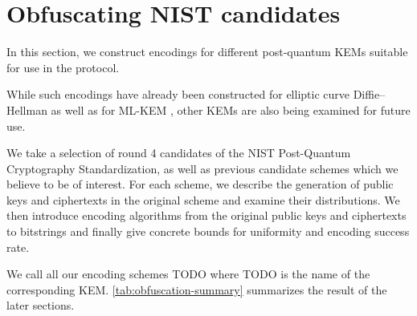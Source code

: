 \chapter{Obfuscating NIST candidates}\label{ch:obfuscation}

In this section, we construct encodings for different post-quantum KEMs suitable for use in the \drivel protocol.

While such encodings have already been constructed for elliptic curve Diffie–Hellman \cite{CCS:BHKL13, tor-dev-udh, USENIX:WWGH11} as well as for ML-KEM \cite{CCS:GunSteVei24}, other KEMs are also being examined for future use.

We take a selection of round 4 candidates of the NIST Post-Quantum Cryptography Standardization, as well as previous candidate schemes which we believe to be of interest.
For each scheme, we describe the generation of public keys and ciphertexts in the original scheme and examine their distributions. We then introduce encoding algorithms from the original public keys and ciphertexts to bitstrings and finally give concrete bounds for uniformity and encoding success rate.

We call all our encoding schemes TODO where TODO is the name of the corresponding KEM. \cref{tab:obfuscation-summary} summarizes the result of the later sections.


